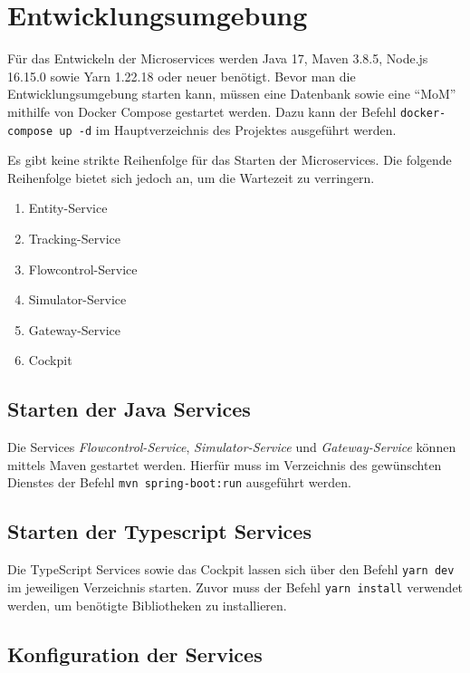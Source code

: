 \section{Entwicklungsumgebung}

Für das Entwickeln der Microservices werden Java 17, Maven 3.8.5, Node.js 16.15.0 sowie Yarn 1.22.18 oder neuer benötigt.
Bevor man die Entwicklungsumgebung starten kann, müssen eine Datenbank sowie eine \enquote{MoM} mithilfe von Docker Compose gestartet werden.
Dazu kann der Befehl \verb|docker-compose up -d| im Hauptverzeichnis des Projektes ausgeführt werden.

Es gibt keine strikte Reihenfolge für das Starten der Microservices.
Die folgende Reihenfolge bietet sich jedoch an, um die Wartezeit zu verringern. 

\begin{enumerate}
	\item Entity-Service
	\item Tracking-Service
	\item Flowcontrol-Service
	\item Simulator-Service
	\item Gateway-Service
	\item Cockpit
\end{enumerate}

\subsection{Starten der Java Services}

Die Services \textit{Flowcontrol-Service}, \textit{Simulator-Service} und \textit{Gateway-Service} können mittels Maven gestartet werden.
Hierfür muss im Verzeichnis des gewünschten Dienstes der Befehl \verb|mvn spring-boot:run| ausgeführt werden.

\subsection{Starten der Typescript Services}

Die TypeScript Services sowie das Cockpit lassen sich über den Befehl \verb|yarn dev| im jeweiligen Verzeichnis starten.
Zuvor muss der Befehl \verb|yarn install| verwendet werden, um benötigte Bibliotheken zu installieren. 

\subsection{Konfiguration der Services}

